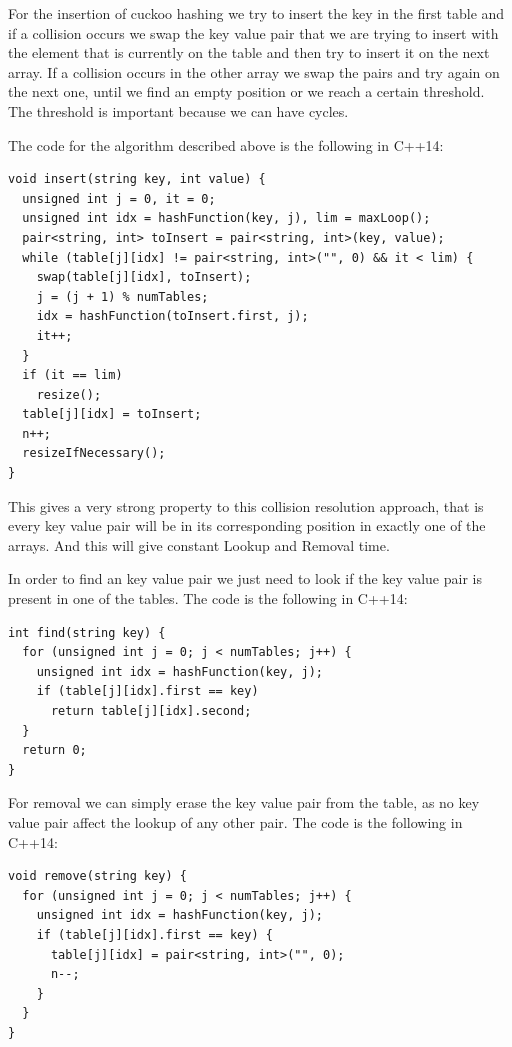 
For the insertion of cuckoo hashing we try to insert the key in the first table and if a collision occurs we swap the key value pair that we are trying to insert with the element that is currently on the table and then try to insert it on the next array. If a collision occurs in the other array we swap the pairs and try again on the next one, until we find an empty position or we reach a certain threshold. The threshold is important because we can have cycles.


The code for the algorithm described above is the following in C++14:

\begin{lstlisting}
void insert(string key, int value) {
  unsigned int j = 0, it = 0;
  unsigned int idx = hashFunction(key, j), lim = maxLoop();
  pair<string, int> toInsert = pair<string, int>(key, value);
  while (table[j][idx] != pair<string, int>("", 0) && it < lim) {
    swap(table[j][idx], toInsert);
    j = (j + 1) % numTables;
    idx = hashFunction(toInsert.first, j);
    it++;
  }
  if (it == lim)
    resize();
  table[j][idx] = toInsert;
  n++;
  resizeIfNecessary();
}
\end{lstlisting}

This gives a very strong property to this collision resolution approach, that is every key value pair will be in its corresponding position in exactly one of the arrays. And this will give constant Lookup and Removal time. 

In order to find an key value pair we just need to look if the key value pair is present in one of the tables. The code is the following in C++14:

\begin{lstlisting}
int find(string key) {
  for (unsigned int j = 0; j < numTables; j++) {
    unsigned int idx = hashFunction(key, j);
    if (table[j][idx].first == key)
      return table[j][idx].second;
  }
  return 0;
}
\end{lstlisting}

For removal we can simply erase the key value pair from the table, as no key value pair affect the lookup of any other pair. The code is the following in C++14:

\begin{lstlisting}
void remove(string key) {
  for (unsigned int j = 0; j < numTables; j++) {
    unsigned int idx = hashFunction(key, j);
    if (table[j][idx].first == key) {
      table[j][idx] = pair<string, int>("", 0);
      n--;
    }
  }
}
\end{lstlisting}

